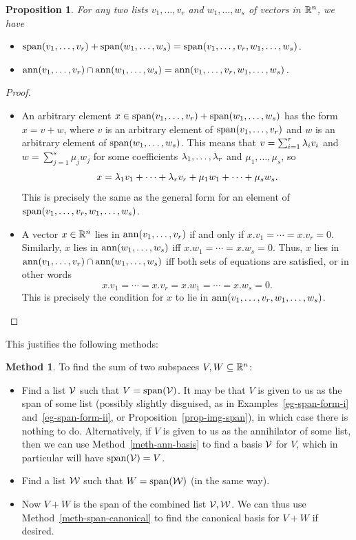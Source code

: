 \documentclass[reqno]{amsart}
\newtheorem{proposition}[theorem]{Proposition}
\theoremstyle{definition}
\newtheorem{method}[theorem]{Method}
\begin{document}
\begin{proposition}\label{prop-sum-meet-concat}
 For any two lists $v_1,\dotsc,v_r$ and $w_1,\dotsc,w_s$ of vectors in
 ${\mathbb{R}}^n$, we have
 \begin{itemize}
  \item[(a)] $\operatorname{span}(v_1,\dotsc,v_r)+\operatorname{span}(w_1,\dotsc,w_s)=
              \operatorname{span}(v_1,\dotsc,v_r,w_1,\dotsc,w_s)$.
  \item[(b)] $\operatorname{ann}(v_1,\dotsc,v_r)\cap\operatorname{ann}(w_1,\dotsc,w_s)=
              \operatorname{ann}(v_1,\dotsc,v_r,w_1,\dotsc,w_s)$.
 \end{itemize}
\end{proposition}
\begin{proof}
 \begin{itemize}
  \item[(a)] An arbitrary element
   $x\in\operatorname{span}(v_1,\dotsc,v_r)+\operatorname{span}(w_1,\dotsc,w_s)$ has the form
   $x=v+w$, where $v$ is an arbitrary element of
   $\operatorname{span}(v_1,\dotsc,v_r)$ and $w$ is an arbitrary element of
   $\operatorname{span}(w_1,\dotsc,w_s)$.  This means that $v=\sum_{i=1}^r\lambda_iv_i$
   and $w=\sum_{j=1}^s\mu_jw_j$ for some coefficients
   $\lambda_1,\dotsc,\lambda_r$ and $\mu_1,\dotsc,\mu_s$, so
   \[ x = \lambda_1v_1+\dotsb+\lambda_rv_r + \mu_1w_1+\dotsb+\mu_sw_s. \]
   This is precisely the same as the general form for an element of
   $\operatorname{span}(v_1,\dotsc,v_r,w_1,\dotsc,w_s)$.
  \item[(b)] A vector $x\in{\mathbb{R}}^n$ lies in $\operatorname{ann}(v_1,\dotsc,v_r)$ if and
   only if $x.v_1=\dotsb=x.v_r=0$.  Similarly, $x$ lies in
   $\operatorname{ann}(w_1,\dotsc,w_s)$ iff $x.w_1=\dotsb=x.w_s=0$.  Thus, $x$ lies in
   $\operatorname{ann}(v_1,\dotsc,v_r)\cap\operatorname{ann}(w_1,\dotsc,w_s)$ iff both sets of
   equations are satisfied, or in other words
   \[ x.v_1=\dotsb=x.v_r=x.w_1=\dotsb=x.w_s=0. \]
   This is precisely the condition for $x$ to lie in
   $\operatorname{ann}(v_1,\dotsc,v_r,w_1,\dotsc,w_s)$.
 \end{itemize}
\end{proof}

This justifies the following methods:
\begin{method}\label{meth-find-sum}
 To find the sum of two subspaces $V,W\subseteq{\mathbb{R}}^n$:
 \begin{itemize}
  \item[(a)] Find a list $\mathcal{V}$ such that $V=\operatorname{span}(\mathcal{V})$.  It may be
   that $V$ is given to us as the span of some list (possibly slightly
   disguised, as in Examples~\ref{eg-span-form-i}
   and~\ref{eg-span-form-ii}, or Proposition~\ref{prop-img-span}), in
   which case there is nothing to do.  Alternatively, if $V$ is given
   to us as the annihilator of some list, then we can use
   Method~\ref{meth-ann-basis} to find a basis $\mathcal{V}$ for $V$, which in
   particular will have $\operatorname{span}(\mathcal{V})=V$.
  \item[(b)] Find a list $\mathcal{W}$ such that $W=\operatorname{span}(\mathcal{W})$ (in the same
   way).
  \item[(c)] Now $V+W$ is the span of the combined list $\mathcal{V},\mathcal{W}$.  We
   can thus use Method~\ref{meth-span-canonical} to find the canonical
   basis for $V+W$ if desired.
 \end{itemize}
\end{method}
\end{document}
